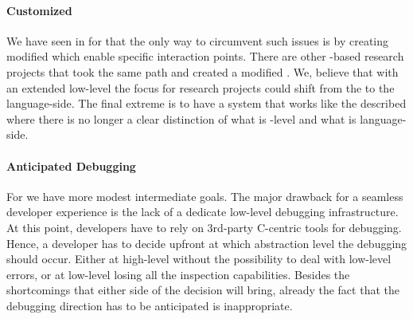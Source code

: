 \paragraph{Customized \VM \MOP}
We have seen in  for \NBJ that the only way to circumvent such issues is by creating modified \VMs which enable specific interaction points.
There are other \PH-based research projects \cite{??} that took the same path and created a modified \VM.
We, believe that with an extended low-level \MOP the focus for research projects could shift from the \VM to the language-side.
The final extreme is to have a system that works like the described \Klein \VM where there is no longer a clear distinction of what is \VM-level and what is language-side.

\paragraph{Anticipated Debugging}
For \B we have more modest intermediate goals.
The major drawback for a seamless developer experience is the lack of a dedicate low-level debugging infrastructure.
At this point, \B developers have to rely on 3rd-party C-centric tools for debugging.
Hence, a developer has to decide upfront at which abstraction level the debugging should occur.
Either at high-level without the possibility to deal with low-level errors, or at low-level losing all the inspection capabilities.
Besides the shortcomings that either side of the decision will bring, already the fact that the debugging direction has to be anticipated is inappropriate.

